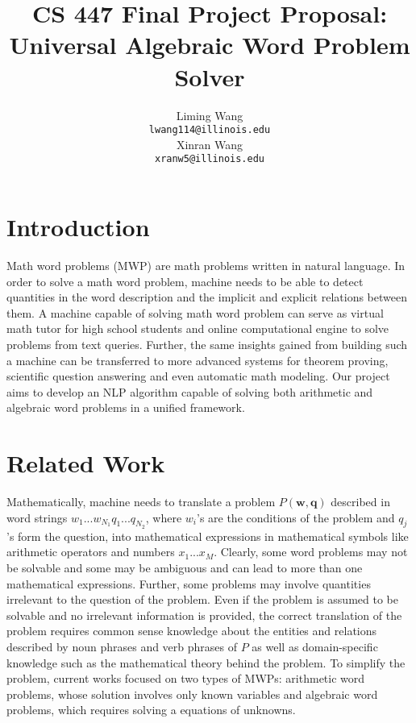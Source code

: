 \documentclass[11pt,a4paper]{article}
\title{CS 447 Final Project Proposal: Universal Algebraic Word Problem Solver}
\author{Liming Wang \\
  {\tt lwang114@illinois.edu} \\\And
  Xinran Wang \\
  {\tt xranw5@illinois.edu}
  }
\date{}
\begin{document}
\maketitle

\section{Introduction}
Math word problems (MWP) are math problems written in natural language. 
In order to solve a math word problem, machine needs to be able to detect 
quantities in the word description and the implicit and explicit relations between them. 
 A machine capable of solving math word problem can serve as virtual math tutor for high school 
 students and online computational 
 engine to solve problems from text queries. Further, the same insights gained from building such a machine can
 be transferred to more advanced systems for theorem proving, scientific question answering and even automatic
 math modeling.
 Our project aims to develop an NLP algorithm capable of solving both arithmetic and algebraic word problems
 in a unified framework. 
 
\section{Related Work}
Mathematically, machine needs to translate a problem $P(\mathbf{w}, \mathbf{q})$ 
described in word strings $w_1 ... w_{N_1} q_1 ... q_{N_2}$, 
where $w_i$'s are the conditions of the problem and $q_j$'s form the question,  
 into mathematical expressions in 
mathematical symbols like arithmetic operators and numbers $x_1 ... x_M$. Clearly, some word problems
may not be solvable and some may be ambiguous and can lead to more than one mathematical expressions.
Further, some problems may involve quantities irrelevant to the question of the problem.
Even if the problem is assumed to be solvable and no irrelevant information is provided, the correct translation
of the problem requires common sense knowledge about the entities and relations described by noun phrases
 and verb phrases of $P$ as well as domain-specific knowledge such as the mathematical theory behind the problem. 
 To simplify the problem, current works focused on two types of MWPs: arithmetic word problems, whose
 solution involves only known variables and algebraic word problems, which requires solving a equations of unknowns. 
\end{document}
